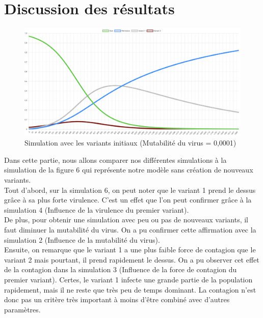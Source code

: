 \documentclass{article}
\begin{document}
\section{Discussion des résultats}

\begin{figure}[h]
    \includegraphics[width=\linewidth]{images/Simulation6.png}
    \caption{Simulation avec les variants initiaux (Mutabilité du virus = 0,0001)}
    \label{fig:simulation6}
\end{figure}


Dans cette partie, nous allons comparer nos différentes simulations à la simulation de la figure 6 qui représente notre modèle sans création de nouveaux variants.\\

Tout d'abord, sur la simulation 6, on peut noter que le variant 1 prend le dessus grâce à sa plus forte virulence. C'est un effet que l'on peut confirmer grâce à la simulation 4 (Influence de la virulence du premier variant).\\

De plus, pour obtenir une simulation avec peu ou pas de nouveaux variants, il faut diminuer la mutabilité du virus. On a pu confirmer cette affirmation avec la simulation 2 (Influence de la mutabilité du virus).\\

Ensuite, on remarque que le variant 1 a une plus faible force de contagion que le variant 2 mais pourtant, il prend rapidement le dessus. On a pu observer cet effet de la contagion dans la simulation 3 (Influence de la force de contagion du premier variant). Certes, le variant 1 infecte une grande partie de la population rapidement, mais il ne reste que très peu de temps dominant. La contagion n'est donc pas un critère très important à moins d'être combiné avec d'autres paramètres.\\
\end{document}
